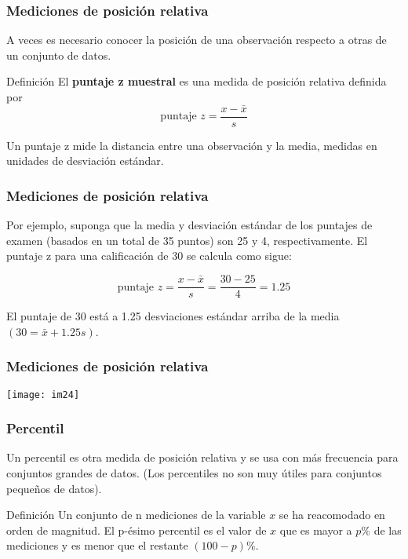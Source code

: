\documentclass[spanish]{beamer}
\begin{document}
\begin{frame}
\frametitle{Mediciones de posición relativa }
A veces es necesario conocer la posición de una observación respecto a otras de un conjunto de datos.

\begin{block}{Definición}
El \textbf{puntaje z muestral} es una medida de posición relativa definida
por
\begin{equation*}
\text{puntaje } z = \frac{x-\bar{x}}{s}
\end{equation*}
\end{block}

Un puntaje z mide la distancia entre una observación y la media, medidas en unidades de desviación estándar.

\end{frame}
\begin{frame}
\frametitle{Mediciones de posición relativa }
Por ejemplo, suponga que la media y desviación estándar de los puntajes de examen (basados en un total de 35 puntos) son 25 y 4, respectivamente. El puntaje z para una calificación de 30 se calcula como sigue:

\begin{equation*}
\text{puntaje } z = \frac{x-\bar{x}}{s}=\frac{30-25}{4}=1.25
\end{equation*}

El puntaje de 30 está a 1.25 desviaciones estándar arriba de la media $(30 = \bar{x}+1.25s)$.
\end{frame}
\begin{frame}
\frametitle{Mediciones de posición relativa }
\begin{center}
\texttt{[image: im24]}
\end{center}
\end{frame}
\begin{frame}
\frametitle{Percentil}
Un percentil es otra medida de posición relativa y se usa con más frecuencia para conjuntos grandes de datos. (Los percentiles no son muy útiles para conjuntos pequeños de datos).

\begin{block}{Definición}
Un conjunto de n mediciones de la variable $x$ se ha reacomodado en
orden de magnitud. El p-ésimo percentil es el valor de $x$ que es mayor a $p\%$ de las mediciones y es menor que el restante $(100 - p)\%$.
\end{block}


\end{frame}
\end{document}
